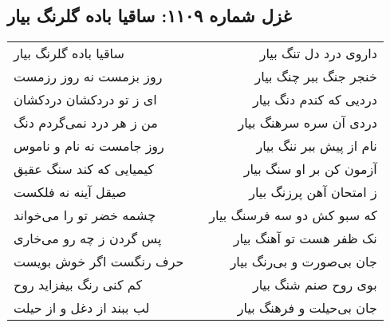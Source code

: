 \begin{center}
\section*{غزل شماره ۱۱۰۹: ساقیا باده گلرنگ بیار}
\label{sec:1109}
\begin{longtable}{l p{0.5cm} r}
ساقیا باده گلرنگ بیار
&&
داروی درد دل تنگ بیار
\\
روز بزمست نه روز رزمست
&&
خنجر جنگ ببر چنگ بیار
\\
ای ز تو دردکشان دردکشان
&&
دردیی که کندم دنگ بیار
\\
من ز هر درد نمی‌گردم دنگ
&&
دردی آن سره سرهنگ بیار
\\
روز جامست نه نام و ناموس
&&
نام از پیش ببر ننگ بیار
\\
کیمیایی که کند سنگ عقیق
&&
آزمون کن بر او سنگ بیار
\\
صیقل آینه نه فلکست
&&
ز امتحان آهن پرزنگ بیار
\\
چشمه خضر تو را می‌خواند
&&
که سبو کش دو سه فرسنگ بیار
\\
پس گردن ز چه رو می‌خاری
&&
نک ظفر هست تو آهنگ بیار
\\
حرف رنگست اگر خوش بویست
&&
جان بی‌صورت و بی‌رنگ بیار
\\
کم کنی رنگ بیفزاید روح
&&
بوی روح صنم شنگ بیار
\\
لب ببند از دغل و از حیلت
&&
جان بی‌حیلت و فرهنگ بیار
\\
\end{longtable}
\end{center}
